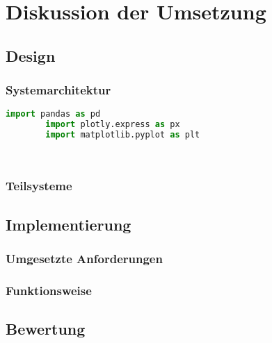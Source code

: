 \chapter{Diskussion der Umsetzung}
\label{chap:five}
\section{Design}
    \subsection{Systemarchitektur}

    \begin{lstlisting}[language=Python, caption=Python example]
        import pandas as pd
        import plotly.express as px
        import matplotlib.pyplot as plt

        
    \end{lstlisting}

    \subsection{Teilsysteme}

\section{Implementierung}
    \subsection{Umgesetzte Anforderungen}
    \subsection{Funktionsweise}

\section{Bewertung}